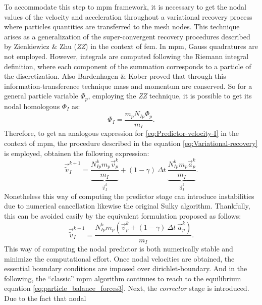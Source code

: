 \documentclass[preprint,12pt,a4paper]{elsarticle}
\begin{document}
To accommodate this step to \acrshort{mpm} framework, it is necessary to get
the nodal values of the velocity and acceleration throughout a variational
recovery process where particles quantities are transferred to the
mesh nodes. This technique arises as a generalization of the super-convergent recovery
procedures described by Zienkiewicz \& Zhu \cite{ZZ1992_I} (\textit{ZZ})
in the context of \acrshort{fem}. In \acrshort{mpm}, Gauss quadratures are not employed. However, 
integrals are computed following the Riemann integral definition,
where each component of the summation corresponds to a particle of the
discretization. Also Bardenhagen \& Kober \cite{Bardenhagen2004}
proved that through this information-transference technique mass and momentum are conserved. So for a general particle variable $\Phi_p$, employing the
\textit{ZZ} technique, it is possible to get its nodal homologous $\Phi_I$  as:
\begin{equation}
  \label{eq:Variational-recovery}
   \Phi_I = \frac{m_p N_{Ip} \Phi_p}{m_I}.
 \end{equation}
 Therefore, to get an analogous expression for
 \eqref{eq:Predictor-velocity-I} in the context of \acrshort{mpm}, the
 procedure described in the equation \eqref{eq:Variational-recovery}
 is employed, obtainen the following expression:
 \begin{equation}
   \label{eq:Predictor-velocity-II}
   \vec{\tilde{v}}_I^{k+1} = \underbrace{\frac{N_{Ip}^{k} m_p
       \vec{v}_p^k}{m_I}}_{\vec{v}_I^{k}} + (1 - \gamma)\ \Delta t\  \underbrace{\frac{N_{Ip}^{k} m_p \vec{a}_p^k}{m_I}}_{\vec{a}_I^{k}}.
 \end{equation}
Nonetheless this way of computing the predictor stage can introduce
instabilities due to numerical cancellation likewise the original
Sulky algorithm. Thankfully, this can be avoided easily by the
equivalent formulation proposed as follows: 
\begin{equation}
  \label{eq:Predictor-velocity-II}
  \vec{\tilde{v}}_I^{k+1} = \frac{ N_{Ip}^{k} m_p (\vec{v}_p^k + (1 - \gamma)\ \Delta t\ \vec{a}_p^k)}{m_I}.
\end{equation}
This way of computing the nodal predictor is both numerically stable
and minimize the computational effort. Once nodal velocities are
obtained, the essential boundary conditions are imposed over \gls{dirichlet-boundary}. And in the
following, the ``classic'' \acrshort{mpm} algorithm continues to reach to the
equilibrium equation \eqref{eq:particle_balance_forces3}. Next, the
\textit{corrector} stage is introduced. Due to the fact that nodal
\end{document}

